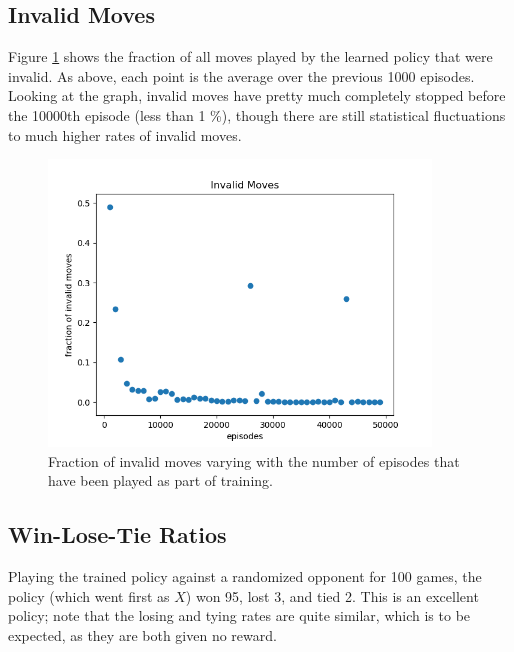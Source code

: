 \documentclass{article}
\begin{document}
   \subsection{Invalid Moves}
   Figure \ref{fig:5c} shows the fraction of all moves played by the learned policy that were invalid. As above, each
   point is the average over the previous 1000 episodes. Looking at the graph, invalid moves have pretty much
   completely stopped before the 10000th episode (less than 1 \%), though there are still statistical fluctuations
   to much higher rates of invalid moves.
      \begin{figure}[h] \centering
          \includegraphics[width=4in]{resources/part5c}
          \caption{ Fraction of invalid moves varying with the number of episodes that have been played as
                  part of training. }
          \label{fig:5c}
       \end{figure}

   \subsection{Win-Lose-Tie Ratios}
   Playing the trained policy against a randomized opponent for 100 games, the policy (which went first as $X$)
   won 95, lost 3, and tied 2. This is an excellent policy; note that the losing and tying rates are quite similar,
   which is to be expected, as they are both given no reward.
\end{document}
